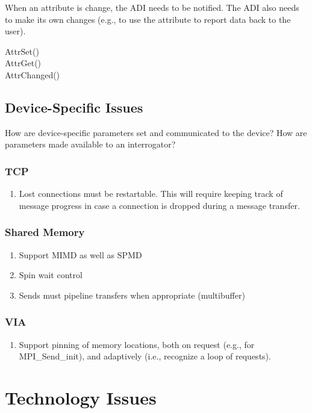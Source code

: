 \documentclass{article}
\begin{document}
When an attribute is change, the ADI needs to be notified.  The ADI also needs
to make its own changes (e.g., to use the attribute to report data back to the
user).

\begin{description}
\item[AttrSet()]
\item[AttrGet()]
\item[AttrChanged()]
\end{description}

\subsection{Device-Specific Issues}
How are device-specific parameters set and communicated to the device?  How
are parameters made available to an interrogator?

\subsubsection{TCP}
\begin{enumerate}
\item Lost connections must be restartable.  This will require keeping track
  of message progress in case a connection is dropped during a message
  transfer. 
\end{enumerate}

\subsubsection{Shared Memory}
\begin{enumerate}
\item Support MIMD as well as SPMD
\item Spin wait control
\item Sends must pipeline transfers when appropriate (multibuffer)
\end{enumerate}

\subsubsection{VIA}
\begin{enumerate}
\item Support pinning of memory locations, both on request (e.g., for
  MPI\_Send\_init), and adaptively (i.e., recognize a loop of requests).
\end{enumerate}


\section{Technology Issues}
\end{document}
